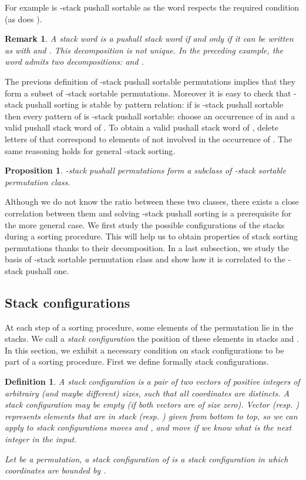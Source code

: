 \documentclass[11pt]{article}
\newtheorem{prop}[thm]{Proposition}
\newtheorem{rem}[thm]{Remark}
\newtheorem{defn}[thm]{Definition}
\begin{document}
For example  is -stack pushall sortable as the word  respects the required condition (as does ). 

\begin{rem}\label{rem:decompoNonUnique}
A stack word  is a pushall stack word if and only if it can be written as  with  and . This decomposition is not unique.
In the preceding example, the word  admits two decompositions:  and .
\end{rem}


The previous definition of -stack pushall sortable permutations implies that they form a subset of -stack sortable permutations. 
Moreover it is easy to check that -stack pushall sorting is stable by pattern relation: if  is -stack pushall sortable then every pattern  of  is -stack pushall sortable: choose an occurrence of  in  and a valid pushall stack word  of . 
To obtain a valid pushall stack word of , delete letters of  that correspond to elements of  not involved in the occurrence of . 
The same reasoning holds for general -stack sorting.

\begin{prop}
-stack pushall permutations form a subclass of -stack sortable permutation class.
\end{prop}


Although we do not know the ratio between these two classes, there exists a close correlation between them and solving -stack pushall sorting is a prerequisite for the more general case. 
We first study the possible configurations of the stacks during a sorting procedure. 
This will help us to obtain properties of stack sorting permutations thanks to their decomposition. 
In a last subsection, we study the basis of -stack sortable permutation class and show how it is correlated to the -stack pushall one.

\subsection{Stack configurations}

At each step of a sorting procedure, some elements of the permutation lie in the stacks. 
We call a {\em stack configuration} the position of these elements in stacks  and . 
In this section, we exhibit a necessary condition on stack configurations to be part of a sorting procedure.
First we define formally stack configurations.

\begin{defn}
A {\em stack configuration} is a pair of two vectors of positive integers  of arbitrairy (and maybe different) sizes, such that all coordinates are distincts.
A stack configuration may be empty (if both vectors are of size zero).
Vector  (resp. ) represents elements that are in stack  (resp. ) given from bottom to top, so we can apply to stack configurations moves  and , and move  if we know what is the next integer in the input.

Let  be a permutation, a stack configuration of  is a stack configuration in which coordinates are bounded by .
\end{defn}
\end{document}
